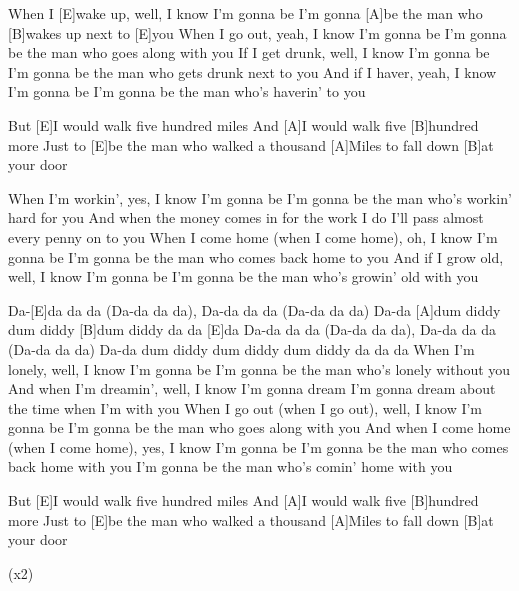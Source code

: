 

\begin{guitar}
	When I [E]wake up, well, I know I'm gonna be
	I'm gonna [A]be the man who [B]wakes up next to [E]you
	When I go out, yeah, I know I'm gonna be
	I'm gonna be the man who goes along with you
	If I get drunk, well, I know I'm gonna be
	I'm gonna be the man who gets drunk next to you
	And if I haver, yeah, I know I'm gonna be
	I'm gonna be the man who's haverin' to you
	
  \smallskip
	But [E]I would walk five hundred miles
	And [A]I would walk five [B]hundred more
	Just to [E]be the man who walked a thousand
	[A]Miles to fall down [B]at your door
	
	When I'm workin', yes, I know I'm gonna be
	I'm gonna be the man who's workin' hard for you
	And when the money comes in for the work I do
	I'll pass almost every penny on to you
	When I come home (when I come home), oh, I know I'm gonna be
	I'm gonna be the man who comes back home to you
	And if I grow old, well, I know I'm gonna be
	I'm gonna be the man who's growin' old with you
	
	 
	
	Da-[E]da da da (Da-da da da), Da-da da da (Da-da da da)
	Da-da [A]dum diddy dum diddy [B]dum diddy da da [E]da
	Da-da da da (Da-da da da), Da-da da da (Da-da da da)
	Da-da dum diddy dum diddy dum diddy da da da
	\pagebreak
	When I'm lonely, well, I know I'm gonna be
	I'm gonna be the man who's lonely without you
	And when I'm dreamin', well, I know I'm gonna dream
	I'm gonna dream about the time when I'm with you
	When I go out (when I go out), well, I know I'm gonna be
	I'm gonna be the man who goes along with you
	And when I come home (when I come home), yes, I know I'm gonna be
	I'm gonna be the man who comes back home with you
	I'm gonna be the man who's comin' home with you
	
  \smallskip
	But [E]I would walk five hundred miles
	And [A]I would walk five [B]hundred more
	Just to [E]be the man who walked a thousand
	[A]Miles to fall down [B]at your door
	
	  (x2)
	
	 
\end{guitar}
